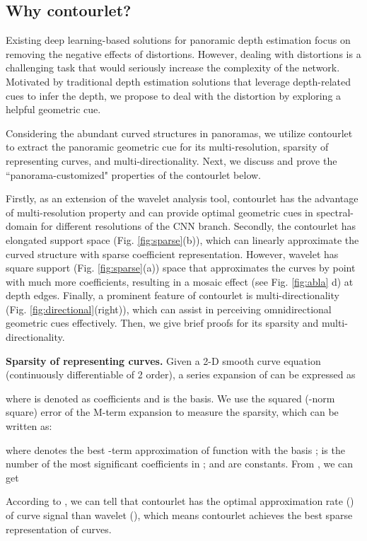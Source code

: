 \documentclass[10pt,times,mathptm,psfig,twocolumn,journals]{IEEEtran}
\begin{document}
\subsection{Why contourlet?}
\label{motivation}
Existing deep learning-based solutions for panoramic depth estimation focus on removing the negative effects of distortions. However, dealing with distortions is a challenging task that would seriously increase the complexity of the network. Motivated by traditional depth estimation solutions that leverage depth-related cues to infer the depth, we propose to deal with the distortion by exploring a helpful geometric cue.

Considering the abundant curved structures in panoramas, we utilize contourlet to extract the panoramic geometric cue for its multi-resolution, sparsity of representing curves, and multi-directionality. Next, we discuss and prove the ``panorama-customized" properties of the contourlet below.


Firstly, as an extension of the wavelet analysis tool, contourlet has the advantage of multi-resolution property and can provide optimal geometric cues in spectral-domain for different resolutions of the CNN branch. Secondly, the contourlet has elongated support space (Fig. \ref{fig:sparse}(b)), which can linearly approximate the curved structure with sparse coefficient representation. However, wavelet has square support (Fig. \ref{fig:sparse}(a)) space that approximates the curves by point with much more coefficients, resulting in a mosaic effect (see Fig. \ref{fig:abla} d) at depth edges. 
Finally, a prominent feature of contourlet is multi-directionality (Fig. \ref{fig:directional}(right)), which can assist in perceiving omnidirectional geometric cues effectively. 
Then, we give brief proofs for its sparsity and multi-directionality.


\textbf{Sparsity of representing curves.} Given a 2-D smooth curve equation  (continuously differentiable of 2 order), a series expansion of  can be expressed as

where  is denoted as coefficients and  is the basis. We use the squared (-norm square) error of the M-term expansion to measure the sparsity, which can be written as:

where  denotes the best -term approximation of function  with the basis ;  is the number of the most significant coefficients in ;  and  are constants. From \cite{MengkunLiu2021CCNNCC}, we can get


According to \cite{DavidLDonoho1998DataCA}, we can tell that contourlet has the optimal approximation rate () of curve signal  than wavelet (), which means contourlet achieves the best sparse representation of curves.
\end{document}
